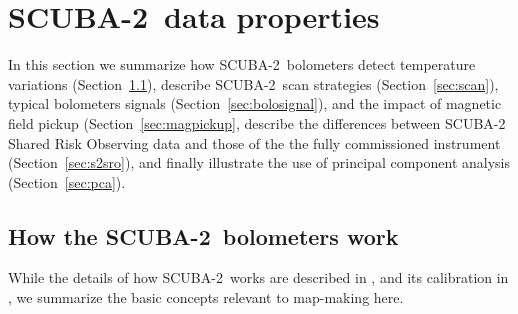 \documentclass[useAMS,usenatbib,nofootinbib]{mn2e}
\newcommand{\scuba}{SCUBA-2}
\begin{document}


\section{\scuba\ data properties}
\label{sec:data}

In this section we summarize how \scuba\ bolometers detect temperature
variations (Section~\ref{sec:bolos}), describe \scuba\ scan strategies
(Section~\ref{sec:scan}), typical bolometers signals
(Section~\ref{sec:bolosignal}), and the impact of magnetic field
pickup (Section~\ref{sec:magpickup}, describe the differences between
SCUBA-2 Shared Risk Observing data and those of the the fully
commissioned instrument (Section~\ref{sec:s2sro}), and finally
illustrate the use of principal component analysis
(Section~\ref{sec:pca}).

\subsection{How the \scuba\ bolometers work}
\label{sec:bolos}

While the details of how \scuba\ works are described in
\citet{holland2012}, and its calibration in \citet{dempsey2012}, we
summarize the basic concepts relevant to map-making here.
\end{document}
